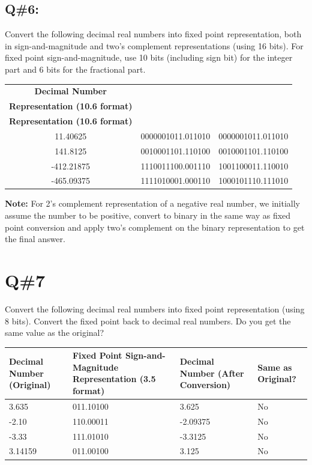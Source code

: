 \subsection*{Q\#6:}
Convert the following decimal real numbers into fixed point representation, both in sign-and-magnitude and two’s complement representations (using 16 bits). For fixed point sign-and-magnitude, use 10 bits (including sign bit) for the integer part and 6 bits for the fractional part.

{\small
\begin{longtable}{|c|c|c|}
\hline
\textbf{Decimal Number} & 
\begin{tabular}[c]{@{}c@{}}\textbf{Fixed Point Sign-and-Magnitude}\\ \textbf{Representation (10.6 format)}\end{tabular} & 
\begin{tabular}[c]{@{}c@{}}\textbf{Fixed Point Two’s Complement}\\ \textbf{Representation (10.6 format)}\end{tabular} \\
\hline
11.40625 & 0000001011.011010 & 0000001011.011010 \\
\hline
141.8125 & 0010001101.110100 & 0010001101.110100 \\
\hline
-412.21875 & 1110011100.001110 & 1001100011.110010 \\
\hline
-465.09375 & 1111010001.000110 & 1000101110.111010 \\
\hline
\end{longtable}
}

\textbf{Note:} For 2’s complement representation of a negative real number, we initially assume the number to be positive, convert to binary in the same way as fixed point conversion and apply two’s complement on the binary representation to get the final answer.

% 

\section*{Q\#7}
Convert the following decimal real numbers into fixed point representation (using 8 bits). Convert the fixed point back to decimal real numbers. Do you get the same value as the original?

\begin{center}
\begin{tabular}{llll}
\toprule
\textbf{Decimal Number (Original)} & \textbf{Fixed Point Sign-and-Magnitude Representation (3.5 format)} & \textbf{Decimal Number (After Conversion)} & \textbf{Same as Original?} \\
\midrule
3.635 & 011.10100 & 3.625 & No \\
-2.10 & 110.00011 & -2.09375 & No \\
-3.33 & 111.01010 & -3.3125 & No \\
3.14159 & 011.00100 & 3.125 & No \\
\bottomrule
\end{tabular}
\end{center}

